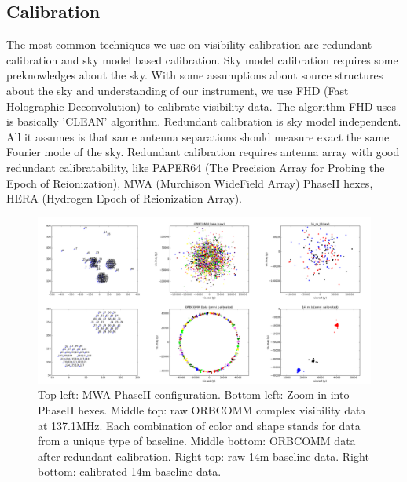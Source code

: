 \documentclass[a0,landscape]{a0poster}
\begin{document}
\begin{multicols}{4}

\section*{Calibration}

The most common techniques we use on visibility calibration are redundant calibration and sky model based calibration. Sky model calibration requires some preknowledges about the sky. With some assumptions about source structures about the sky and understanding of our instrument, we use FHD (Fast Holographic Deconvolution) to calibrate visibility data. The algorithm FHD uses is basically 'CLEAN' algorithm. Redundant calibration is sky model independent. All it assumes is that same antenna separations should measure exact the same Fourier mode of the sky. Redundant calibration requires antenna array with good redundant calibratability, like PAPER64 (The Precision Array for Probing the Epoch of Reionization), MWA (Murchison WideField Array) PhaseII hexes, HERA (Hydrogen Epoch of Reionization Array).

\begin{figure}[H]
\centering
\label{Redundant calibration on MWA PhaseII ORBCOMM data}
\includegraphics[width=0.85\linewidth]{figures/omnical_on_ORBCOMM.png}
\caption{Top left: MWA PhaseII configuration. Bottom left: Zoom in into PhaseII hexes. Middle top: raw ORBCOMM complex visibility data at 137.1MHz. Each combination of color and shape stands for data from a unique type of baseline. Middle bottom: ORBCOMM data after redundant calibration. Right top: raw 14m baseline data. Right bottom: calibrated 14m baseline data.}
\end{figure}




\end{multicols}
\end{document}
